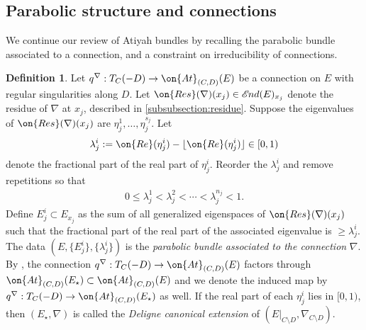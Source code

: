 \documentclass[12 pt]{amsart}
\theoremstyle{plain}
\theoremstyle{definition}
\newtheorem{definition}[subsubsection]{Definition}
\theoremstyle{remark}
\numberwithin{equation}{section}
\newcommand*{\sheafend}{\mathscr{E}\kern -1pt nd}
\begin{document}
\subsection{Parabolic structure and connections}
\label{subsection:atiyah-properties}
We continue  our review of Atiyah bundles by recalling the parabolic bundle
associated to a connection, and a constraint on irreducibility of connections.

\begin{definition}
	\label{definition:associated-parabolic}
	Let $q^\nabla: T_C(-D) \to \on{At}_{(C,D)}(E)$ be a connection on $E$
	with regular singularities along $D$.
	Let $\on{Res}(\nabla)(x_j) \in \sheafend(E)_{x_j}$ denote the residue
	of $\nabla$ at $x_j$, described in \autoref{subsubsection:residue}.
	Suppose the eigenvalues of $\on{Res}(\nabla)(x_j)$ are $\eta_j^1, \ldots,
	\eta^{s_j}_j$. Let $$\lambda^i_j:=\on{Re}(\eta^i_j)-\lfloor \on{Re}(\eta^i_j)\rfloor \in[0,1)$$ denote the fractional part of the real
	part of $\eta^i_j$. Reorder the $\lambda^i_j$ and remove repetitions so that
	\begin{align*}
		0 \leq \lambda^1_j < \lambda^2_j < \cdots < \lambda_j^{n_j} < 1.
	\end{align*}
	Define $E^i_j \subset E_{x_j}$ as the sum of all generalized eigenspaces
	of $\on{Res}(\nabla)(x_j)$
	such that the fractional part of the real part of the associated
	eigenvalue is $\geq \lambda^i_j$.
	The data $(E, \{E^i_j\}, \{\lambda^i_j\})$ is the {\em parabolic bundle
	associated to the connection} $\nabla$.
	By \cite[Lemma 4.1]{BHH:parabolic}, the connection $q^\nabla: T_C(-D) \to
	\on{At}_{(C, D)}(E)$
	factors through $\on{At}_{(C, D)}(E_\star) \subset \on{At}_{(C, D)}(E)$
	and we denote the induced map by $q^\nabla : T_C(-D) \to \on{At}_{(C,
	D)}(E_\star)$ as well.
	If the real part of each $\eta^i_j$ lies in $[0,1)$, then $(E_\star,
	\nabla)$ is
	called the {\em Deligne canonical extension} of $(E|_{C \setminus D},
	\nabla_{C \setminus D})$.
\end{definition}
\end{document}
